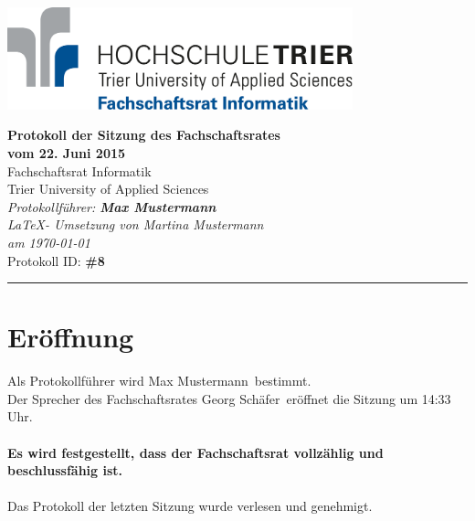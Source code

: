 \documentclass[a4paper, 11pt]{article} %
\newcommand{\protokoller}{Max Mustermann}
\newcommand{\dateOfMeeting}{22. Juni 2015}
\newcommand{\TeXer}{Martina Mustermann}
\newcommand{\fsiPresident}{Georg Schäfer}
\newcommand{\protocolID}{8}
\begin{document}

\doublespacing
\thispagestyle{empty}

\begin{center}
\includegraphics[width=10.0cm]{../logo_fsi.eps}

\vspace*{\fill}
{\LARGE \textbf{Protokoll der Sitzung des Fachschaftsrates \\vom \dateOfMeeting}}\\
Fachschaftsrat Informatik\\
Trier University of Applied Sciences\\
\vspace{2.5cm}
\textit{
	Protokollführer: \textbf{\protokoller} \\
	\LaTeX - Umsetzung von \TeXer\\
	am \today\\
}
Protokoll ID: \textbf{\#\protocolID}
\vfill
\end{center}

\hspace*{-35cm}
\textcolor{fsi}{\rule{64.9cm}{15pt}}
\pagebreak
 
\setcounter{tocdepth}{2}
\tableofcontents 
\pagebreak

\section{Eröffnung}
Als Protokollführer wird \protokoller~bestimmt.\\
Der Sprecher des Fachschaftsrates \fsiPresident~eröffnet die Sitzung um 14:33 Uhr.
\\\\
\textbf{Es wird festgestellt, dass der Fachschaftsrat vollzählig und beschlussfähig ist.}
\\\\
Das Protokoll der letzten Sitzung wurde verlesen und genehmigt.
\end{document}
